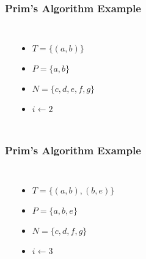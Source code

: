 \documentclass[dvipsnames]{beamer}
\begin{document}
\begin{frame}
  \frametitle{Prim's Algorithm Example}

  \begin{example}[$1 < 7$]
    \begin{columns}
      \begin{center}
      \end{center}

      \pause
      \begin{itemize}
        \item $T = \{ (a,b) \}$
        \item $P = \{ a, b \}$
        \item $N = \{ c, d, e, f, g \}$
        \item $i \leftarrow 2$
      \end{itemize}
    \end{columns}
  \end{example}
\end{frame}

\begin{frame}
  \frametitle{Prim's Algorithm Example}

  \begin{example}[$2 < 7$]
    \begin{columns}
      \begin{center}
      \end{center}

      \pause
      \begin{itemize}
        \item $T = \{ (a,b), (b,e) \}$
        \item $P = \{ a, b, e \}$
        \item $N = \{ c, d, f, g \}$
        \item $i \leftarrow 3$
      \end{itemize}
    \end{columns}
  \end{example}
\end{frame}
\end{document}
